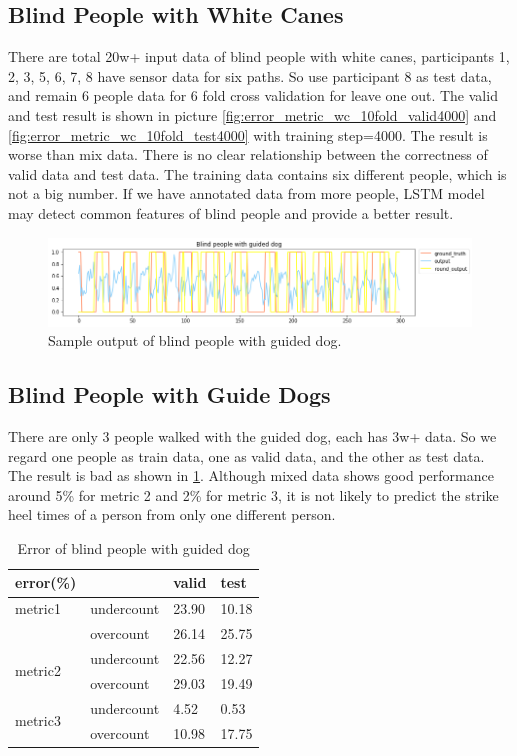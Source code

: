 \documentclass[11pt]{article}
\begin{document}
{\subsection{Blind People with White Canes}
There are total 20w+ input data of blind people with white canes, participants 1, 2, 3, 5, 6, 7, 8 have sensor data for six paths. So use participant 8 as test data, and remain 6 people data for 6 fold cross validation for leave one out. The valid and test result is shown in picture \ref{fig:error_metric_wc_10fold_valid4000} and \ref{fig:error_metric_wc_10fold_test4000} with training step=4000. The result is worse than mix data. There is no clear relationship between the correctness of valid data and test data. The training data contains six different people, which is not a big number. If we have annotated data from more people, LSTM model may detect common features of blind people and provide a better result.

\begin{figure}[ht]
\centering
\includegraphics[scale=0.5]{blind_gd}
\caption{Sample output of blind people with guided dog.}
\label{fig:blind_gd}
\end{figure}


\subsection{Blind People with Guide Dogs}

There are only 3 people walked with the guided dog, each has 3w+ data. So we regard one people as train data, one as valid data, and the other as test data. The result is bad as shown in \ref{fig:blind_gd}. Although mixed data shows good performance around 5\% for metric 2 and 2\% for metric 3, it is not likely to predict the strike heel times of a person from only one different person.

\begin{table}[]
\centering
\caption{Error of blind people with guided dog}
\label{my-label}
\begin{tabular}{llll}
\hline
error(\%)                &            & valid & test  \\ \hline
metric1                  & undercount & 23.90 & 10.18 \\
                         & overcount  & 26.14 & 25.75 \\ \hline
\multirow{2}{*}{metric2} & undercount & 22.56 & 12.27 \\
                         & overcount  & 29.03 & 19.49 \\ \hline
\multirow{2}{*}{metric3} & undercount & 4.52  & 0.53  \\
                         & overcount  & 10.98 & 17.75 \\ \hline
\end{tabular}
\end{table}


}
\end{document}
